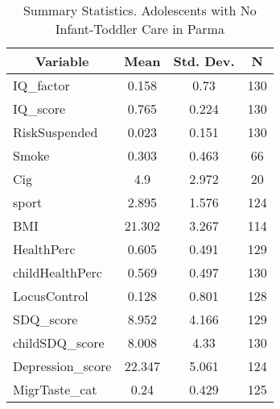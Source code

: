 
\begin{table}[htbp]\centering \caption{Summary Statistics. Adolescents with No Infant-Toddler Care in Parma \label{bothAdolasiloNoneParma}}
\begin{tabular}{l c c  c}\hline\hline
\multicolumn{1}{c}{\textbf{Variable}} & \textbf{Mean}
 & \textbf{Std. Dev.} & \textbf{N}\\ \hline
IQ\_factor & 0.158 & 0.73  & 130\\
IQ\_score & 0.765 & 0.224  & 130\\
RiskSuspended & 0.023 & 0.151  & 130\\
Smoke & 0.303 & 0.463  & 66\\
Cig & 4.9 & 2.972  & 20\\
sport & 2.895 & 1.576  & 124\\
BMI & 21.302 & 3.267  & 114\\
HealthPerc & 0.605 & 0.491  & 129\\
childHealthPerc & 0.569 & 0.497  & 130\\
LocusControl & 0.128 & 0.801  & 128\\
SDQ\_score & 8.952 & 4.166  & 129\\
childSDQ\_score & 8.008 & 4.33  & 130\\
Depression\_score & 22.347 & 5.061  & 124\\
MigrTaste\_cat & 0.24 & 0.429  & 125\\
\hline\end{tabular}
\end{table}
